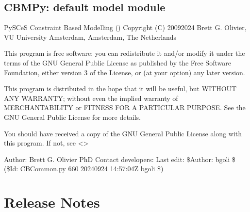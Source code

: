 \documentclass[letterpaper,12pt,english]{sphinxmanual}
\begin{document}

\subsection{CBMPy: default model module}
\label{\detokenize{api/visualization:cbmpy-default-model-module}}\label{\detokenize{api/visualization:module-cbmpy.CBDefaultModels}}
\sphinxAtStartPar
PySCeS Constraint Based Modelling ()
Copyright (C) 2009\sphinxhyphen{}2024 Brett G. Olivier, VU University Amsterdam, Amsterdam, The Netherlands

\sphinxAtStartPar
This program is free software: you can redistribute it and/or modify
it under the terms of the GNU General Public License as published by
the Free Software Foundation, either version 3 of the License, or
(at your option) any later version.

\sphinxAtStartPar
This program is distributed in the hope that it will be useful,
but WITHOUT ANY WARRANTY; without even the implied warranty of
MERCHANTABILITY or FITNESS FOR A PARTICULAR PURPOSE.  See the
GNU General Public License for more details.

\sphinxAtStartPar
You should have received a copy of the GNU General Public License
along with this program.  If not, see \textless{}\textgreater{}

\sphinxAtStartPar
Author: Brett G. Olivier PhD
Contact developers: 
Last edit: \$Author: bgoli \$ (\$Id: CBCommon.py 660 2024\sphinxhyphen{}09\sphinxhyphen{}24 14:57:04Z bgoli \$)

\sphinxstepscope


\section{Release Notes}
\label{\detokenize{release-notes:release-notes}}\label{\detokenize{release-notes::doc}}
\end{document}
